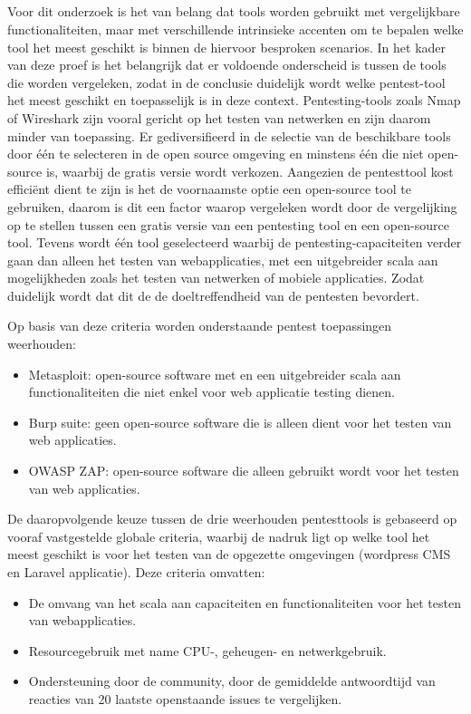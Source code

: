 \subsection{}
Voor dit onderzoek is het van 
belang dat tools worden gebruikt met vergelijkbare functionaliteiten, maar met verschillende intrinsieke accenten om te bepalen welke 
tool het meest geschikt is binnen de hiervoor besproken scenarios. In het kader van deze proef is het belangrijk dat er voldoende onderscheid is tussen de tools 
die worden vergeleken, zodat in de conclusie duidelijk wordt welke pentest-tool het meest geschikt en toepasselijk is in deze context. 
Pentesting-tools zoals Nmap of Wireshark zijn vooral gericht op het testen van netwerken en  zijn daarom minder van toepassing. Er 
gediversifieerd in de selectie van de beschikbare tools door één te selecteren in de open source omgeving en minstens één die niet open-source is, waarbij de gratis versie wordt 
verkozen. Aangezien de pentesttool kost efficiënt dient te zijn is het de voornaamste optie een open-source tool te gebruiken, daarom 
is dit een factor waarop vergeleken wordt door de vergelijking op te stellen tussen een gratis versie van een pentesting tool en een open-source tool. 
Tevens wordt één tool geselecteerd waarbij de pentesting-capaciteiten verder gaan dan alleen het testen van webapplicaties, met een 
uitgebreider scala aan mogelijkheden zoals het testen van netwerken of mobiele applicaties. Zodat duidelijk wordt dat dit de
de doeltreffendheid van de pentesten bevordert.

Op basis van deze criteria worden onderstaande pentest toepassingen weerhouden:
\begin{itemize}
    \item Metasploit: open-source software met en een uitgebreider scala aan functionaliteiten die niet enkel voor web applicatie testing dienen.
    \item Burp suite: geen open-source software die is alleen dient voor het testen van web applicaties.
    \item OWASP ZAP: open-source software die alleen gebruikt wordt voor het testen van web applicaties.
\end{itemize}


De daaropvolgende keuze tussen de drie weerhouden pentesttools is gebaseerd op vooraf vastgestelde globale criteria, waarbij de nadruk ligt op welke tool het meest 
geschikt is voor het testen van de opgezette omgevingen (wordpress CMS en Laravel applicatie). Deze criteria omvatten:
\begin{itemize}
    \item De omvang van het scala aan capaciteiten en functionaliteiten voor het testen van webapplicaties.
    \item Resourcegebruik met name CPU-, geheugen- en netwerkgebruik.
    \item Ondersteuning door de community, door de gemiddelde antwoordtijd van reacties van 20 laatste openstaande issues te vergelijken.
\end{itemize}

